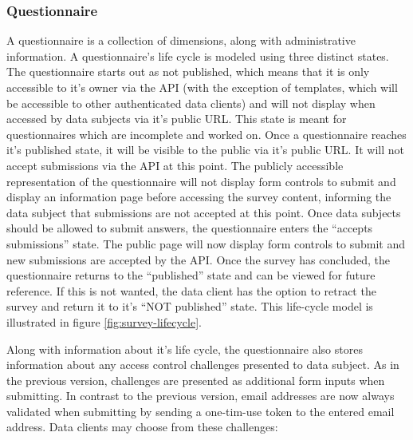\documentclass[a4paper,11pt]{article}
\begin{document}
                \subsubsection{Questionnaire}
                    A questionnaire is a collection of dimensions, along with administrative
                    information. A questionnaire's life cycle is modeled using three
                    distinct states. The questionnaire starts out as not published,
                    which means that it is only accessible to it's owner via the API
                    (with the exception of templates, which will be accessible to other
                    authenticated data clients)
                    and will not display when accessed by data subjects via it's
                    public URL. This state is meant for questionnaires which are
                    incomplete and worked on. Once a questionnaire reaches it's
                    published state, it will be visible to the public via it's
                    public URL. It will not accept submissions via the API at this point.
                    The publicly accessible representation of the questionnaire will
                    not display form controls to submit and display an information
                    page before accessing the survey content, informing the data subject
                    that submissions are not accepted at this point. Once data subjects
                    should be allowed to submit answers, the questionnaire enters
                    the ``accepts submissions'' state. The public page will now display
                    form controls to submit and new submissions are accepted by the API.
                    Once the survey has concluded, the questionnaire returns to
                    the ``published'' state and can be viewed for future reference.
                    If this is not wanted, the data client has the option to retract
                    the survey and return it to it's ``NOT published'' state.
                    This life-cycle model is illustrated in figure \ref{fig:survey-lifecycle}.

                    Along with information about it's life cycle, the questionnaire
                    also stores information about any access control challenges
                    presented to data subject. As in the previous version, challenges
                    are presented as additional form inputs when submitting. 
                    In contrast to the previous version, email addresses are now always
                    validated when submitting by sending a one-tim-use token to the
                    entered email address.
                    Data clients may choose from these challenges:
                    
\end{document}
